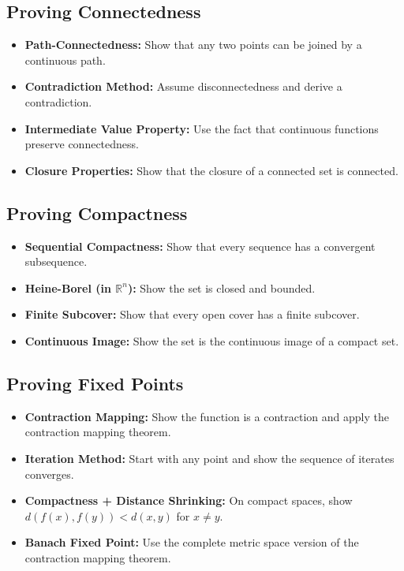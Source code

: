 \subsection*{Proving Connectedness}

\begin{itemize}
\item \textbf{Path-Connectedness:} Show that any two points can be joined by a continuous path.

\item \textbf{Contradiction Method:} Assume disconnectedness and derive a contradiction.

\item \textbf{Intermediate Value Property:} Use the fact that continuous functions preserve connectedness.

\item \textbf{Closure Properties:} Show that the closure of a connected set is connected.
\end{itemize}

\subsection*{Proving Compactness}

\begin{itemize}
\item \textbf{Sequential Compactness:} Show that every sequence has a convergent subsequence.

\item \textbf{Heine-Borel (in $\mathbb{R}^n$):} Show the set is closed and bounded.

\item \textbf{Finite Subcover:} Show that every open cover has a finite subcover.

\item \textbf{Continuous Image:} Show the set is the continuous image of a compact set.
\end{itemize}

\subsection*{Proving Fixed Points}

\begin{itemize}
\item \textbf{Contraction Mapping:} Show the function is a contraction and apply the contraction mapping theorem.

\item \textbf{Iteration Method:} Start with any point and show the sequence of iterates converges.

\item \textbf{Compactness + Distance Shrinking:} On compact spaces, show $d(f(x), f(y)) < d(x,y)$ for $x \neq y$.

\item \textbf{Banach Fixed Point:} Use the complete metric space version of the contraction mapping theorem.
\end{itemize}

